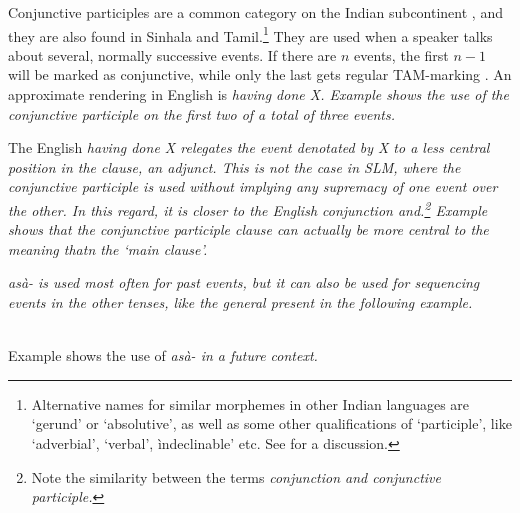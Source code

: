 Conjunctive participles are a common category on the Indian subcontinent \citep{Bloch1934,Emeneau1956,Masica1976}, and they are also found in Sinhala and Tamil.\footnote{Alternative names for similar morphemes in other Indian languages are `gerund' or `absolutive', as well as some other qualifications of `participle', like `adverbial', `verbal', ìndeclinable' etc. See \citet[110]{Masica1976} for a discussion.} They are used when a speaker talks about several, normally successive events. If there are $n$ events, the first $n-1$ will be marked as conjunctive, while only the last gets regular TAM-marking \citep[cf.][]{Slomanson2008lingua}. An approximate rendering in English is \em having done X\em. Example   shows the use of the conjunctive participle on the first two of a total of three events.
 
 
 
The English \em having done X \em relegates the event denotated by X to a less central position in the clause, an adjunct. This is not the case in SLM, where the conjunctive participle is used without implying any supremacy of one event over the other. In this regard, it is closer to the English conjunction \em and\em.\footnote{Note the similarity between the terms \em conjunction \em and \em conjunctive participle\em.} Example   shows that the conjunctive participle clause can actually be more central to the meaning thatn the `main clause'.


\em asà- \em is used most often for past events, but it can also be used for sequencing events in the other tenses, like the general present in the following example.

 \\
Example  shows the use of \em asà- \em in  a future context.
 
